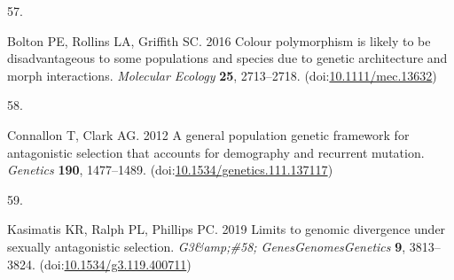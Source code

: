 \documentclass[
  11pt,
  a4paper,
]{article}
\newlength{\cslhangindent}
\newlength{\csllabelwidth}
\newlength{\cslentryspacingunit} %
\newenvironment{CSLReferences}[2] %
 {%
  \setlength{\parindent}{0pt}
  \ifodd #1
  \let\oldpar\par
  \def\par{\hangindent=\cslhangindent\oldpar}
  \fi
  \setlength{\parskip}{#2\cslentryspacingunit}
 }%
 {}
\newcommand{\CSLLeftMargin}[1]{\parbox[t]{\csllabelwidth}{#1}}
\newcommand{\CSLRightInline}[1]{\parbox[t]{\linewidth - \csllabelwidth}{#1}\break}
\begin{document}
\begin{CSLReferences}{0}{0}
\leavevmode{}%
\CSLLeftMargin{57. }%
\CSLRightInline{Bolton PE, Rollins LA, Griffith SC. 2016 Colour polymorphism is likely to be disadvantageous to some populations and species due to genetic architecture and morph interactions. \emph{Molecular Ecology} \textbf{25}, 2713--2718. (doi:\href{https://doi.org/10.1111/mec.13632}{10.1111/mec.13632})}

\leavevmode{}%
\CSLLeftMargin{58. }%
\CSLRightInline{Connallon T, Clark AG. 2012 A general population genetic framework for antagonistic selection that accounts for demography and recurrent mutation. \emph{Genetics} \textbf{190}, 1477--1489. (doi:\href{https://doi.org/10.1534/genetics.111.137117}{10.1534/genetics.111.137117})}

\leavevmode{}%
\CSLLeftMargin{59. }%
\CSLRightInline{Kasimatis KR, Ralph PL, Phillips PC. 2019 Limits to genomic divergence under sexually antagonistic selection. \emph{G3\&amp;\#58; Genes\textbar Genomes\textbar Genetics} \textbf{9}, 3813--3824. (doi:\href{https://doi.org/10.1534/g3.119.400711}{10.1534/g3.119.400711})}

\end{CSLReferences}
\end{document}
